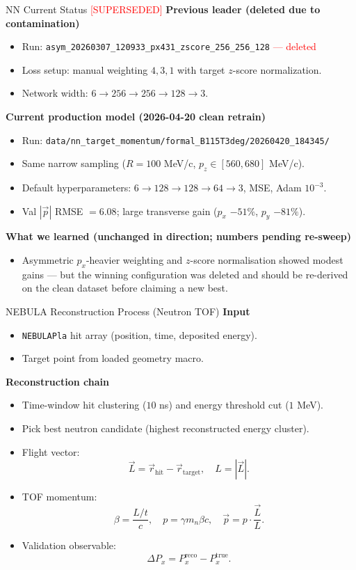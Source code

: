 \documentclass[aspectratio=169]{beamer}
\begin{document}
\begin{frame}{NN Current Status \textcolor{red}{[SUPERSEDED]}}
\textbf{Previous leader (deleted due to contamination)}
\begin{itemize}
\item Run: \texttt{asym\_20260307\_120933\_px431\_zscore\_256\_256\_128} \textcolor{red}{--- deleted}
\item Loss setup: manual weighting \(4,3,1\) with target \(z\)-score normalization.
\item Network width: \(6 \rightarrow 256 \rightarrow 256 \rightarrow 128 \rightarrow 3\).
\end{itemize}

\textbf{Current production model (2026-04-20 clean retrain)}
\begin{itemize}
\item Run: \texttt{data/nn\_target\_momentum/formal\_B115T3deg/20260420\_184345/}
\item Same narrow sampling (\(R=100\) MeV/c, \(p_z\in[560,680]\) MeV/c).
\item Default hyperparameters: \(6\rightarrow 128\rightarrow 128\rightarrow 64\rightarrow 3\), MSE, Adam \(10^{-3}\).
\item Val \(|\vec p|\) RMSE \(= 6.08\); large transverse gain (\(p_x\) \(-51\%\), \(p_y\) \(-81\%\)).
\end{itemize}

\textbf{What we learned (unchanged in direction; numbers pending re-sweep)}
\begin{itemize}
\item Asymmetric \(p_x\)-heavier weighting and \(z\)-score normalisation
showed modest gains --- but the winning configuration was deleted and
should be re-derived on the clean dataset before claiming a new best.
\end{itemize}
\end{frame}

\begin{frame}{NEBULA Reconstruction Process (Neutron TOF)}
\textbf{Input}
\begin{itemize}
\item \texttt{NEBULAPla} hit array (position, time, deposited energy).
\item Target point from loaded geometry macro.
\end{itemize}

\textbf{Reconstruction chain}
\begin{itemize}
\item Time-window hit clustering (\(10\) ns) and energy threshold cut (\(1\) MeV).
\item Pick best neutron candidate (highest reconstructed energy cluster).
\item Flight vector:
\[
\vec{L}=\vec{r}_{\mathrm{hit}}-\vec{r}_{\mathrm{target}},\quad L=|\vec{L}|.
\]
\item TOF momentum:
\[
\beta=\frac{L/t}{c},\quad p=\gamma m_n \beta c,\quad \vec{p}=p\cdot\frac{\vec{L}}{L}.
\]
\item Validation observable:
\[
\Delta P_x = P_x^{\mathrm{reco}} - P_x^{\mathrm{true}}.
\]
\end{itemize}
\end{frame}
\end{document}
